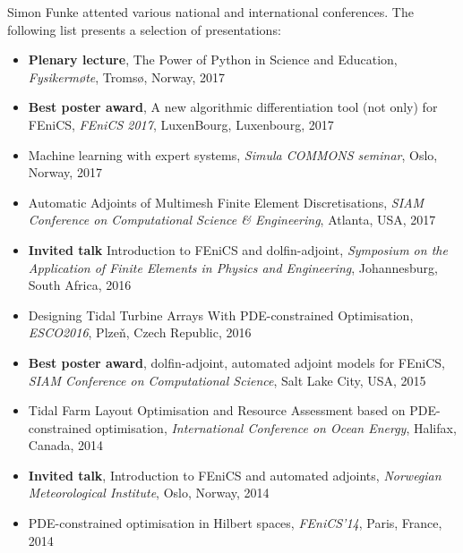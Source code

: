 \documentclass[11pt]{article}
\newenvironment{outerlist}[1][\enskip\textbullet]
        {\begin{itemize}[ #1]}{\end{itemize}}
\begin{document}

Simon Funke attented various national and international conferences. The following list
presents a selection of presentations:
\begin{outerlist}
\item[] \textbf{Plenary lecture}, The Power of Python in Science and Education, \textit{Fysikerm{\o}te}, Troms\o, Norway, 2017 %
\item[] \textbf{Best poster award}, A new algorithmic differentiation tool (not only) for FEniCS, \textit{FEniCS 2017}, LuxenBourg, Luxenbourg, 2017
\item[] Machine learning with expert systems, \textit{Simula COMMONS seminar}, Oslo, Norway, 2017
\item[] Automatic Adjoints of Multimesh Finite Element Discretisations, \textit{SIAM Conference on Computational Science \& Engineering}, Atlanta, USA, 2017
\item[] \textbf{Invited talk} Introduction to FEniCS and dolfin-adjoint, \textit{Symposium on the Application of Finite Elements in Physics and Engineering}, Johannesburg, South Africa, 2016
\item[] Designing Tidal Turbine Arrays With PDE-constrained Optimisation, \textit{ESCO2016}, Plze\v{n}, Czech Republic, 2016
\item[] \textbf{Best poster award}, dolfin-adjoint, automated adjoint models for FEniCS, \textit{SIAM Conference on Computational Science}, Salt Lake City, USA, 2015
\item[] Tidal Farm Layout Optimisation and Resource Assessment based on PDE-constrained optimisation, \textit{International Conference on Ocean Energy}, Halifax, Canada, 2014
\item[] \textbf{Invited talk}, Introduction to FEniCS and automated adjoints, \textit{Norwegian Meteorological Institute}, Oslo, Norway, 2014
\item[] PDE-constrained optimisation in Hilbert spaces, \textit{FEniCS'14}, Paris, France, 2014

\end{outerlist}
\end{document}
